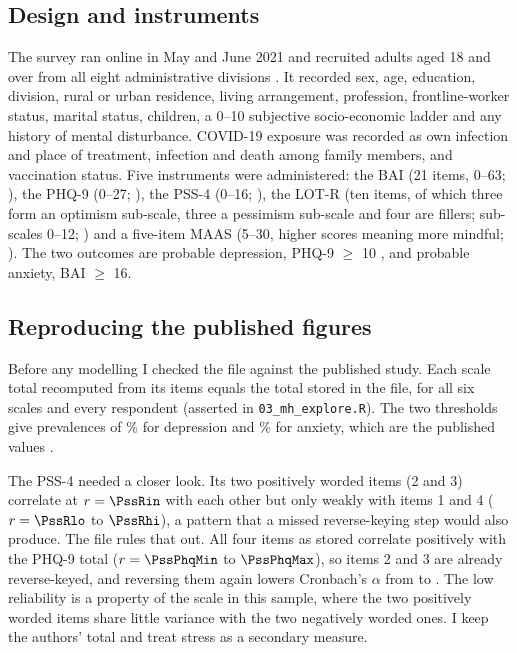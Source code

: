 \subsection{Design and instruments}
The survey ran online in May and June 2021 and recruited adults aged 18 and over from all eight administrative divisions \parencite{islam2023}. It recorded sex, age, education, division, rural or urban residence, living arrangement, profession, frontline-worker status, marital status, children, a 0--10 subjective socio-economic ladder and any history of mental disturbance. COVID-19 exposure was recorded as own infection and place of treatment, infection and death among family members, and vaccination status. Five instruments were administered: the BAI (21 items, 0--63; \cite{beck1988}), the PHQ-9 (0--27; \cite{kroenke2001}), the PSS-4 (0--16; \cite{cohen1983}), the LOT-R (ten items, of which three form an optimism sub-scale, three a pessimism sub-scale and four are fillers; sub-scales 0--12; \cite{scheier1994}) and a five-item MAAS (5--30, higher scores meaning more mindful; \cite{brown2003}). The two outcomes are probable depression, PHQ-9 $\geq$ 10 \parencite{manea2012}, and probable anxiety, BAI $\geq$ 16.

\subsection{Reproducing the published figures}\label{sec:reproduce}
Before any modelling I checked the file against the published study. Each scale total recomputed from its items equals the total stored in the file, for all six scales and every respondent (asserted in \texttt{03\_mh\_explore.R}). The two thresholds give prevalences of \PrevDep\% for depression and \PrevAnx\% for anxiety, which are the published values \parencite{islam2023}.

The PSS-4 needed a closer look. Its two positively worded items (2 and 3) correlate at $r = \PssRin$ with each other but only weakly with items 1 and 4 ($r = \PssRlo$ to $\PssRhi$), a pattern that a missed reverse-keying step would also produce. The file rules that out. All four items as stored correlate positively with the PHQ-9 total ($r = \PssPhqMin$ to $\PssPhqMax$), so items 2 and 3 are already reverse-keyed, and reversing them again lowers Cronbach's $\alpha$ from \AlphaPSS{} to \PssAlphaFlip. The low reliability is a property of the scale in this sample, where the two positively worded items share little variance with the two negatively worded ones. I keep the authors' total and treat stress as a secondary measure.

